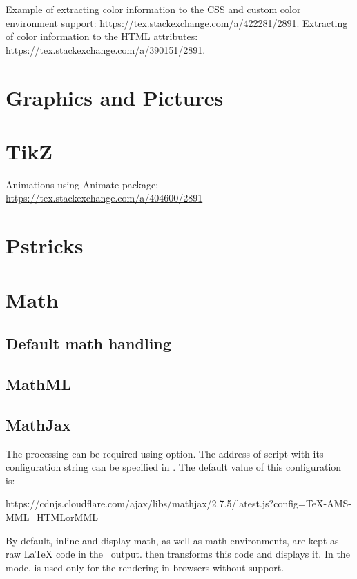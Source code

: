 \documentclass{book}
\begin{document}
Example of extracting color information to the CSS and custom color environment support:
\url{https://tex.stackexchange.com/a/422281/2891}. Extracting of color information to the HTML attributes:
\url{https://tex.stackexchange.com/a/390151/2891}.



\section{Graphics and Pictures}


\section{TikZ }

Animations using Animate package: \url{https://tex.stackexchange.com/a/404600/2891}
\section{Pstricks}

\section{Math}
\subsection{Default math handling}
\subsection{MathML}
\subsection{MathJax}

The  processing can be required using  option.
The address of  script with its configuration string can be
specified in . The default value of this configuration is:

\begin{texsource}
{https://cdnjs.cloudflare.com/ajax/libs/mathjax/2.7.5/latest.js?config=TeX-AMS-MML_HTMLorMML}
\end{texsource}

By default, inline and display math, as well as math environments, are kept as
raw LaTeX code in the \HTML\ output.  then transforms this code
and displays it. In the  mode,  is used only for the
rendering in browsers without  support. 
\end{document}
